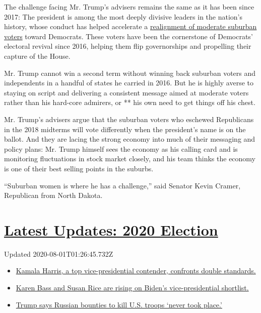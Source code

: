 The challenge facing Mr. Trump's advisers remains the same as it has
been since 2017: The president is among the most deeply divisive leaders
in the nation's history, whose conduct has helped accelerate a
\href{https://www.nytimes.com/2019/11/06/us/politics/kentucky-governor-virginia-election.html}{realignment
of moderate suburban voters} toward Democrats. These voters have been
the cornerstone of Democrats' electoral revival since 2016, helping them
flip governorships and propelling their capture of the House.

Mr. Trump cannot win a second term without winning back suburban voters
and independents in a handful of states he carried in 2016. But he is
highly averse to staying on script and delivering a consistent message
aimed at moderate voters rather than his hard-core admirers, or ** his
own need to get things off his chest.

Mr. Trump's advisers argue that the suburban voters who eschewed
Republicans in the 2018 midterms will vote differently when the
president's name is on the ballot. And they are lacing the strong
economy into much of their messaging and policy plans: Mr. Trump himself
sees the economy as his calling card and is monitoring fluctuations in
stock market closely, and his team thinks the economy is one of their
best selling points in the suburbs.

``Suburban women is where he has a challenge,'' said Senator Kevin
Cramer, Republican from North Dakota.

\hypertarget{latest-updates-2020-election}{%
\section{\texorpdfstring{\href{https://www.nytimes.com/2020/07/31/us/elections/biden-vs-trump.html?action=click\&pgtype=Article\&state=default\&region=MAIN_CONTENT_1\&context=storylines_live_updates}{Latest
Updates: 2020
Election}}{Latest Updates: 2020 Election}}\label{latest-updates-2020-election}}

Updated 2020-08-01T01:26:45.732Z

\begin{itemize}
\tightlist
\item
  \href{https://www.nytimes.com/2020/07/31/us/elections/biden-vs-trump.html?action=click\&pgtype=Article\&state=default\&region=MAIN_CONTENT_1\&context=storylines_live_updates\#link-29fdff45}{Kamala
  Harris, a top vice-presidential contender, confronts double
  standards.}
\item
  \href{https://www.nytimes.com/2020/07/31/us/elections/biden-vs-trump.html?action=click\&pgtype=Article\&state=default\&region=MAIN_CONTENT_1\&context=storylines_live_updates\#link-13ec3d9c}{Karen
  Bass and Susan Rice are rising on Biden's vice-presidential
  shortlist.}
\item
  \href{https://www.nytimes.com/2020/07/31/us/elections/biden-vs-trump.html?action=click\&pgtype=Article\&state=default\&region=MAIN_CONTENT_1\&context=storylines_live_updates\#link-49e9a016}{Trump
  says Russian bounties to kill U.S. troops `never took place.'}
\end{itemize}

